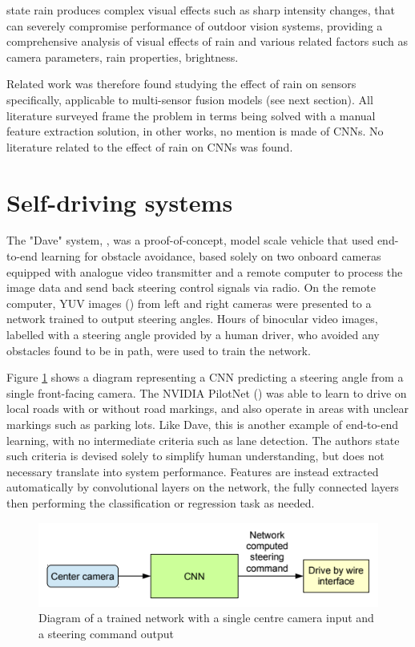 \cite{garg2007vision} state rain produces complex visual effects such as sharp intensity changes, that can severely compromise performance of outdoor vision systems, providing a comprehensive analysis of visual effects of rain and various related factors such as camera parameters, rain properties, brightness.
  
Related work was therefore found studying the  effect of rain on sensors specifically, applicable to multi-sensor fusion models (see next section). All literature surveyed frame the problem in terms being solved with a manual feature extraction solution, in other works, no mention is made of CNNs. No literature related to the effect of rain on CNNs was found.

\section{Self-driving systems}
The "Dave" system, \cite{lecun2004dave}, was a proof-of-concept, model scale vehicle that used end-to-end learning for obstacle avoidance, based solely on two onboard cameras equipped with analogue video transmitter and a remote computer to process the image data and send back steering control signals via radio. On the remote computer, YUV images (\cite{maller2020}) from left and right cameras were presented to a network trained to output steering angles. Hours of binocular video images, labelled with a steering angle provided by a human driver, who avoided any obstacles found to be in path, were used to train the network.

Figure \ref{fig:bojarski-net}
shows a diagram representing a CNN predicting a steering angle from a single  front-facing camera. The NVIDIA PilotNet (\cite{bojarski2016end}) was able to learn to drive on local roads with or without road markings, and also operate in areas with unclear markings such as parking lots. Like Dave, this is another example of end-to-end learning, with no intermediate criteria such as lane detection. The authors state such criteria is devised solely to simplify human understanding, but does not necessary translate into system performance. Features are instead extracted automatically by convolutional layers on the network, the fully connected layers then performing the classification or regression task as needed.

\begin{figure}[ht]
 \centering 
 \includegraphics[scale=1]{Figures/bojarski-nvidia.png}
 \caption{Diagram of a trained network with a single centre camera input and a steering command output}
 \label{fig:bojarski-net}
\end{figure}

